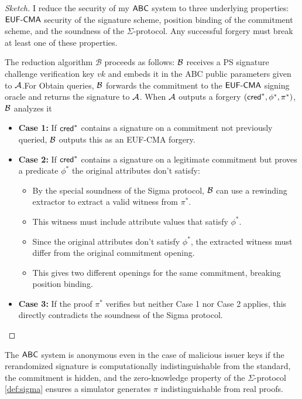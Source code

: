 \begin{proof}[Sketch]
I reduce the security of my $\mathsf{ABC}$ system to three underlying properties: $\mathsf{EUF\text{-}CMA}$ security of the signature scheme, position binding of the commitment scheme, and the soundness of the $\Sigma$-protocol. Any successful forgery must break at least one of these properties.

The reduction algorithm $\mathcal{B}$ proceeds as follows: $\mathcal{B}$ receives a PS signature challenge verification key $vk$ and embeds it in the ABC public parameters given to $\mathcal{A}$.For Obtain queries, $\mathcal{B}$ forwards the commitment to the $\mathsf{EUF\text{-}CMA}$ signing oracle and returns the signature to $\mathcal{A}$. When $\mathcal{A}$ outputs a forgery $(\mathsf{cred}^*, \phi^*, \pi^*)$, $\mathcal{B}$ analyzes it
\begin{itemize}
    \item \textbf{Case 1:} If $\mathsf{cred}^*$ contains a signature on a commitment not previously queried, $\mathcal{B}$ outputs this as an EUF-CMA forgery.

    \item \textbf{Case 2:} If $\mathsf{cred}^*$ contains a signature on a legitimate commitment but proves a predicate $\phi^*$ the original attributes don't satisfy:
        \begin{itemize}
        \item By the special soundness of the Sigma protocol, $\mathcal{B}$ can use a rewinding extractor to extract a valid witness from $\pi^*$.
        \item This witness must include attribute values that satisfy $\phi^*$.
        \item Since the original attributes don't satisfy $\phi^*$, the extracted witness must differ from the original commitment opening.
        \item This gives two different openings for the same commitment, breaking position binding.
    \end{itemize}

    \item \textbf{Case 3:} If the proof $\pi^*$ verifies but neither Case 1 nor Case 2 applies, this directly contradicts the soundness of the Sigma protocol.

\end{itemize}

\end{proof}



\begin{theorem}[Anonymity]
    The $\mathsf{ABC}$ system is anonymous even in the case of malicious issuer keys if the rerandomized signature is computationally indistinguishable from the standard, the commitment is hidden, and the zero-knowledge property of the $\Sigma$-protocol \ref{def:sigma} ensures a simulator generates $\pi$ indistinguishable from real proofs. 
\end{theorem}



